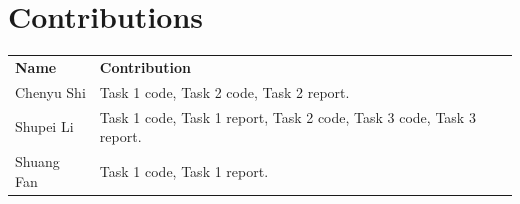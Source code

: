 \documentclass{article}
\begin{document}
\section*{Contributions}
\begin{tabular}{ll}
    \textbf{Name} & \textbf{Contribution}\\
    Chenyu Shi & Task 1 code, Task 2 code, Task 2 report.\\
    Shupei Li & Task 1 code, Task 1 report, Task 2 code, Task 3 code, Task 3 report.\\
    Shuang Fan & Task 1 code, Task 1 report.\\
\end{tabular}
\end{document}
